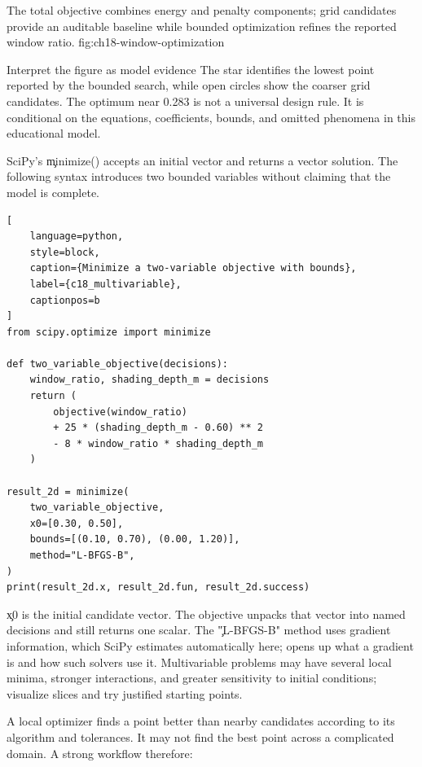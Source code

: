 {The total objective combines energy and penalty components; grid candidates provide an auditable baseline while bounded optimization refines the reported window ratio.}
{fig:ch18-window-optimization}

\begin{ExplainBox}{Interpret the figure as model evidence}
The star identifies the lowest point reported by the bounded search, while open
circles show the coarser grid candidates. The optimum near 0.283 is not a
universal design rule. It is conditional on the equations, coefficients,
bounds, and omitted phenomena in this educational model.
\end{ExplainBox}


SciPy's \c{minimize()} accepts an initial vector and returns a vector solution.
The following syntax introduces two bounded variables without claiming that the
model is complete.

\begin{lstlisting}[
    language=python,
    style=block,
    caption={Minimize a two-variable objective with bounds},
    label={c18_multivariable},
    captionpos=b
]
from scipy.optimize import minimize

def two_variable_objective(decisions):
    window_ratio, shading_depth_m = decisions
    return (
        objective(window_ratio)
        + 25 * (shading_depth_m - 0.60) ** 2
        - 8 * window_ratio * shading_depth_m
    )

result_2d = minimize(
    two_variable_objective,
    x0=[0.30, 0.50],
    bounds=[(0.10, 0.70), (0.00, 1.20)],
    method="L-BFGS-B",
)
print(result_2d.x, result_2d.fun, result_2d.success)
\end{lstlisting}

\c{x0} is the initial candidate vector. The objective unpacks that vector into
named decisions and still returns one scalar. The \c{"L-BFGS-B"} method uses
gradient information, which SciPy estimates automatically here;
 opens up what a gradient is and how such solvers
use it. Multivariable problems may have several local minima, stronger
interactions, and greater sensitivity to initial conditions; visualize slices
and try justified starting points.


A local optimizer finds a point better than nearby candidates according to its
algorithm and tolerances. It may not find the best point across a complicated
domain. A strong workflow therefore:

